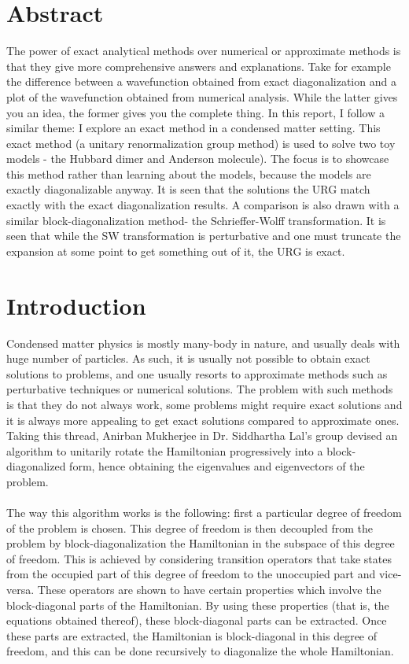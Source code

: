 \documentclass[12pt]{article}
\begin{document}
\section*{Abstract}
The power of exact analytical methods over numerical or approximate methods is that they give more comprehensive answers and explanations. Take for example the difference between a wavefunction obtained from exact diagonalization and a plot of the wavefunction obtained from numerical analysis. While the latter gives you an idea, the former gives you the complete thing. In this report, I follow a similar theme: I explore an exact method in a condensed matter setting. This exact method (a unitary renormalization group method) is used to solve two toy models - the Hubbard dimer and Anderson molecule). The focus is to showcase this method rather than learning about the models, because the models are exactly diagonalizable anyway. It is seen that the solutions the URG match exactly with the exact diagonalization results. A comparison is also drawn with a similar block-diagonalization method- the Schrieffer-Wolff transformation. It is seen that while the SW transformation is perturbative and one must truncate the expansion at some point to get something out of it, the URG is exact.
\newpage

\tableofcontents

\newpage
\section{Introduction}
Condensed matter physics is mostly many-body in nature, and usually deals with huge number of particles. As such, it is usually not possible to obtain exact solutions to problems, and one usually resorts to approximate methods such as perturbative techniques or numerical solutions. The problem with such methods is that they do not always work, some problems might require exact solutions and it is always more appealing to get exact solutions compared to approximate ones. Taking this thread, Anirban Mukherjee in Dr. Siddhartha Lal's group devised an algorithm to unitarily rotate the Hamiltonian progressively into a block-diagonalized form, hence obtaining the eigenvalues and eigenvectors of the problem.
\paragraph{}
The way this algorithm works is the following: first a particular degree of freedom of the problem is chosen. This degree of freedom is then decoupled from the problem by block-diagonalization  the Hamiltonian in the subspace of this degree of freedom. This is achieved by considering transition operators that take states from the occupied part of this degree of freedom to the unoccupied part and vice-versa. These operators are shown to have certain properties which involve the block-diagonal parts of the Hamiltonian. By using these properties (that is, the equations obtained thereof), these block-diagonal parts can be extracted. Once these parts are extracted, the Hamiltonian is block-diagonal in this degree of freedom, and this can be done recursively to diagonalize the whole Hamiltonian.
\end{document}
